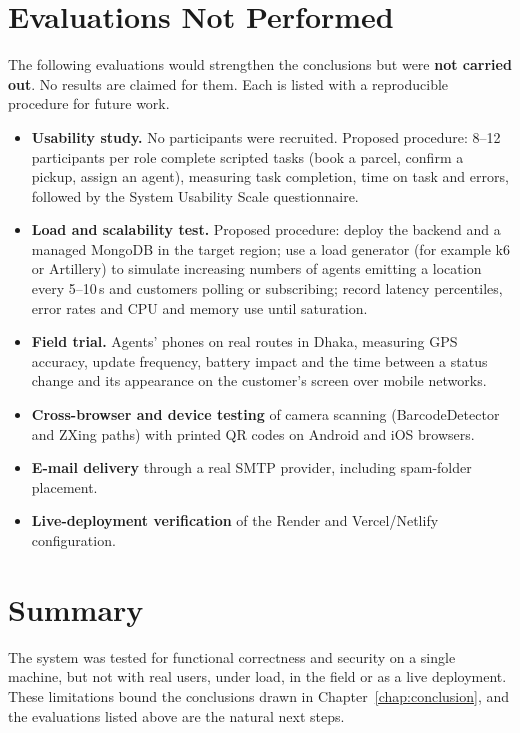 \section{Evaluations Not Performed}
\label{sec:notdone}

The following evaluations would strengthen the conclusions but were \textbf{not carried out}. No results are claimed for them. Each is listed with a reproducible procedure for future work.

\begin{itemize}
  \item \textbf{Usability study.} No participants were recruited. Proposed procedure: 8--12 participants per role complete scripted tasks (book a parcel, confirm a pickup, assign an agent), measuring task completion, time on task and errors, followed by the System Usability Scale questionnaire.
  \item \textbf{Load and scalability test.} Proposed procedure: deploy the backend and a managed MongoDB in the target region; use a load generator (for example k6 or Artillery) to simulate increasing numbers of agents emitting a location every 5--10\,s and customers polling or subscribing; record latency percentiles, error rates and CPU and memory use until saturation.
  \item \textbf{Field trial.} Agents' phones on real routes in Dhaka, measuring GPS accuracy, update frequency, battery impact and the time between a status change and its appearance on the customer's screen over mobile networks.
  \item \textbf{Cross-browser and device testing} of camera scanning (BarcodeDetector and ZXing paths) with printed QR codes on Android and iOS browsers.
  \item \textbf{E-mail delivery} through a real SMTP provider, including spam-folder placement.
  \item \textbf{Live-deployment verification} of the Render and Vercel/Netlify configuration.
\end{itemize}

\section{Summary}

The system was tested for functional correctness and security on a single machine, but not with real users, under load, in the field or as a live deployment. These limitations bound the conclusions drawn in Chapter~\ref{chap:conclusion}, and the evaluations listed above are the natural next steps.
